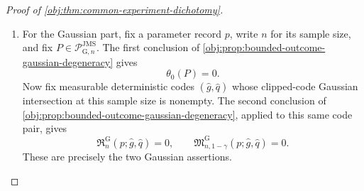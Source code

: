 \documentclass[11pt]{article}
\begin{document}
\begin{proof}[Proof of \cref{obj:thm:common-experiment-dichotomy}]
\begin{enumerate}
For the compiled statement, fix a compiled bounded spectral adapter satisfying the full canonical build-and-compilation specification for
\((p_j,\mathfrak p_{\star,j},\mathfrak c_{\theta,\star,j},\widehat g)\). The represented-data soundness implication for compiled bounded spectral adapters states that this full canonical build-and-compilation specification entails the represented-execution contract for the same parameter record, primitive bank record, range record, and treatment-code sequence. Its proof rewrites the pilot-boundary, winding-quadrature, and evaluation-quadrature entry points to the reference finite programs, identifies the compiled represented program with the ordinary finite-rational program on canonical represented inputs, and then applies the clipping certificate for \(\mathfrak c_{\theta,\star,j}\). Therefore the compiled represented-data execution realizes
\[
(p_j,\mathfrak p_{\star,j},\mathfrak c_{\theta,\star,j},\widehat g)
\]
with the same ordinary finite-rational result, trace, and certified clipped output required by the represented-execution clause of the theorem.

\item
For the Gaussian part, fix a parameter record \(p\), write \(n\) for its sample size, and fix \(P\in\mathcal P_{\mathrm G,n}^{\mathrm{JMS}}\). The first conclusion of \cref{obj:prop:bounded-outcome-gaussian-degeneracy} gives
\[
\theta_0(P)=0.
\]
Now fix measurable deterministic codes \((\widehat g,\widehat q)\) whose clipped-code Gaussian intersection at this sample size is nonempty. The second conclusion of \cref{obj:prop:bounded-outcome-gaussian-degeneracy}, applied to this same code pair, gives
\[
\mathfrak R_{n}^{\mathrm G}(p;\widehat g,\widehat q)=0,
\qquad
\mathfrak M_{n,1-\gamma}^{\mathrm G}(p;\widehat g,\widehat q)=0.
\]
These are precisely the two Gaussian assertions.
\end{enumerate}
\end{proof}
\end{document}
